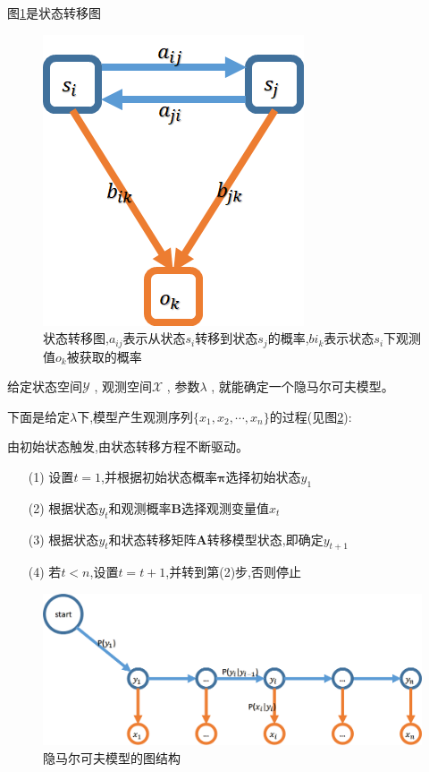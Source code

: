 \documentclass[UTF8,a4paper]{ctexart}%
\begin{document}
            图\ref{statusstransferfig}是状态转移图
            \begin{figure}[!htbp]
              \centering
              \includegraphics[scale=0.5]{assets/jiqixuexi4_85f62.png}
              \caption{状态转移图,$a_{ij}$表示从状态$s_i$转移到状态$s_j$的概率,$b{i_k}$表示状态$s_i$下观测值$o_k$被获取的概率}
              \label{statusstransferfig}
            \end{figure}

            给定状态空间$\mathcal{Y}$ , 观测空间$\mathcal{X}$ , 参数$\lambda$ , 就能确定一个隐马尔可夫模型。

            下面是给定$\lambda$下,模型产生观测序列$\{x_1, x_2, \cdots , x_n\}$的过程(见图\ref{generationOfHMM}):

            {\color{blue}
              由初始状态触发,由状态转移方程不断驱动。
            }
            \begin{itemize}
              \item [(1)] 设置$t=1$,并根据初始状态概率$\bm{\pi}$选择初始状态$y_1$
              \item [(2)] 根据状态$y_t$和观测概率$\bm{B}$选择观测变量值$x_t$
              \item [(3)] 根据状态$y_t$和状态转移矩阵$\bm{A}$转移模型状态,即确定$y_{t+1}$
              \item [(4)] 若$t<n$,设置$t=t+1$,并转到第(2)步,否则停止
            \end{itemize}

            \begin{figure}[!htbp]
              \centering
              \includegraphics[scale=0.4]{assets/jiqixuexi4_06c36.png}
              \caption{隐马尔可夫模型的图结构}
              \label{generationOfHMM}
            \end{figure}
\end{document}
